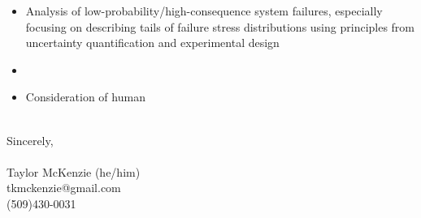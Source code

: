 \documentclass[10pt]{article}
\begin{document}
\begin{itemize}
	\item Analysis of low-probability/high-consequence system failures, especially focusing on describing tails of failure stress distributions using principles from uncertainty quantification and experimental design
	\item 
	\item Consideration of human
\end{itemize}

\noindent \\Sincerely,\\\\
Taylor McKenzie (he/him)\\
tkmckenzie@gmail.com\\
(509)430-0031
\end{document}
